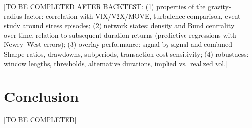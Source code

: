 \documentclass[12pt]{article}
\begin{document}
[TO BE COMPLETED AFTER BACKTEST:
(1) properties of the gravity-radius factor: correlation with VIX/V2X/MOVE, turbulence comparison, event study around stress episodes;
(2) network states: density and Bund centrality over time, relation to subsequent duration returns (predictive regressions with Newey--West errors);
(3) overlay performance: signal-by-signal and combined Sharpe ratios, drawdowns, subperiods, transaction-cost sensitivity;
(4) robustness: window lengths, thresholds, alternative durations, implied vs.\ realized vol.]

\section{Conclusion}\label{sec:conclusion}

[TO BE COMPLETED]


\end{document}
